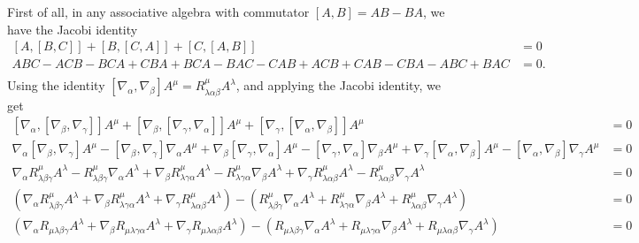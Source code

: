 \documentclass{../../templates/lkx_pset}
\begin{document}
\begin{solution}
  First of all, in any associative algebra with commutator $[A, B] = AB-BA$, we have the Jacobi identity
  \[
    \begin{aligned}
      [A, [B,C]] + [B,[C,A]] + [C, [A,B]]
      &=0\\
      ABC-ACB - BCA+CBA + BCA-BAC
      -CAB+ACB + CAB - CBA - ABC+BAC
      &=0.\\
    \end{aligned}
  \]
  Using the identity $[\nabla_{\alpha}, \nabla_\beta] A^\mu = R^\mu_{\lambda\alpha\beta} A^\lambda$, and applying the Jacobi identity, we get
  \[
    \begin{aligned}
    [\nabla_\alpha, [\nabla_\beta, \nabla_\gamma]]A^\mu + 
    [\nabla_\beta, [\nabla_\gamma, \nabla_\alpha]]A^\mu + 
    [\nabla_\gamma, [\nabla_\alpha, \nabla_\beta]]A^\mu 
    &= 0\\
    \nabla_\alpha [\nabla_\beta, \nabla_\gamma] A^{\mu} - [\nabla_\beta, \nabla_\gamma]\nabla_\alpha A^{\mu}
    +\nabla_\beta[\nabla_\gamma, \nabla_\alpha] A^{\mu} - [\nabla_\gamma, \nabla_\alpha]\nabla_\beta A^{\mu}
    +\nabla_\gamma[\nabla_\alpha, \nabla_\beta] A^{\mu} - [\nabla_\alpha, \nabla_\beta]\nabla_\gamma A^{\mu}
    &=0\\
    \nabla_\alpha R^{\mu}_{\lambda\beta\gamma}A^\lambda 
    -R^{\mu}_{\lambda\beta\gamma} \nabla_\alpha A^\lambda
    +\nabla_\beta R^{\mu}_{\lambda\gamma\alpha}A^\lambda 
    -R^{\mu}_{\lambda\gamma\alpha} \nabla_\beta A^\lambda
    +\nabla_\gamma R^{\mu}_{\lambda\alpha\beta}A^\lambda 
    -R^{\mu}_{\lambda\alpha\beta} \nabla_\gamma A^\lambda
    &=0\\
    (
    \nabla_\alpha R^{\mu}_{\lambda\beta\gamma}A^\lambda 
    +\nabla_\beta R^{\mu}_{\lambda\gamma\alpha}A^\lambda 
    +\nabla_\gamma R^{\mu}_{\lambda\alpha\beta}A^\lambda 
    ) -
    (
    R^{\mu}_{\lambda\beta\gamma} \nabla_\alpha A^\lambda
    +R^{\mu}_{\lambda\gamma\alpha} \nabla_\beta A^\lambda
    +R^{\mu}_{\lambda\alpha\beta} \nabla_\gamma A^\lambda
      ) &=0\\
    (
    \nabla_\alpha R_{\mu\lambda\beta\gamma}A^\lambda 
    +\nabla_\beta R_{\mu\lambda\gamma\alpha}A^\lambda 
    +\nabla_\gamma R_{\mu\lambda\alpha\beta}A^\lambda 
    ) -
    (
    R_{\mu\lambda\beta\gamma} \nabla_\alpha A^\lambda
    +R_{\mu\lambda\gamma\alpha} \nabla_\beta A^\lambda
    +R_{\mu\lambda\alpha\beta} \nabla_\gamma A^\lambda
      ) &=0\\
    \end{aligned}
  \]

\end{solution}
\end{document}

